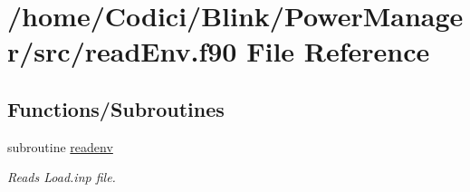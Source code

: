 \hypertarget{read_env_8f90}{\section{/home/\-Codici/\-Blink/\-Power\-Manager/src/read\-Env.f90 File Reference}
\label{read_env_8f90}
}
\subsection*{Functions/\-Subroutines}
\begin{DoxyCompactItemize}
\item 
subroutine \hyperlink{read_env_8f90_abbf9c1134a1b66ecec7138afb589e107}{readenv}
\begin{DoxyCompactList}\small\item\em Reads Load.\-inp file. \end{DoxyCompactList}\end{DoxyCompactItemize}


